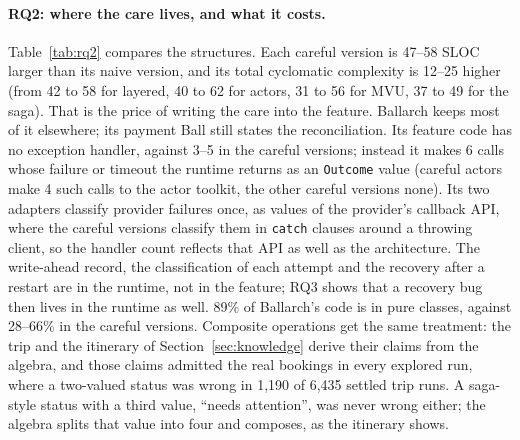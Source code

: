 \documentclass[11pt]{article}
\theoremstyle{definition}
\theoremstyle{plain}
\begin{document}
\begin{table}[t]
\caption{RQ2: structure of the feature code in scenario~A; \emph{Naive} gives the range over the four naive versions. Metrics: CBO~\citep{ChidamberKemerer1994}; LCOM4~\citep{HitzMontazeri1995} and CAMC~\citep{Bansiya1999CAMC} over hand-written methods, without the members the compiler generates; distance from the main sequence $D$~\citep{Martin1994Metrics}, counting efferent coupling to other feature packages only, or to every dependency except the JDK and Kotlin's standard library as Martin defines it; propagation cost~\citep{MacCormackRusnakBaldwin2006} at three granularities; cyclomatic complexity~\citep{McCabe1976} counted on bytecode as JaCoCo defines it~\citep{JaCoCo}, without the branches the compiler generates. Exception handlers are \texttt{catch} clauses and \texttt{runCatching} calls. \emph{Failures returned as values} counts the calls whose failure or timeout a library returns as a value: \texttt{ask} and \texttt{pipeToSelf} in the actor toolkit, \texttt{Call} and \texttt{Runtime.request} in Ballarch. A pure class has no mutable field and no reference to concurrency, I/O, clocks, randomness, the database, the provider or a runtime.}
\label{tab:rq2}
\end{table}

\paragraph{RQ2: where the care lives, and what it costs.} Table~\ref{tab:rq2} compares the structures. Each careful version is 47--58 SLOC larger than its naive version, and its total cyclomatic complexity is 12--25 higher (from 42 to 58 for layered, 40 to 62 for actors, 31 to 56 for MVU, 37 to 49 for the saga). That is the price of writing the care into the feature. Ballarch keeps most of it elsewhere; its payment Ball still states the reconciliation. Its feature code has no exception handler, against 3--5 in the careful versions; instead it makes 6 calls whose failure or timeout the runtime returns as an \texttt{Outcome} value (careful actors make 4 such calls to the actor toolkit, the other careful versions none). Its two adapters classify provider failures once, as values of the provider's callback API, where the careful versions classify them in \texttt{catch} clauses around a throwing client, so the handler count reflects that API as well as the architecture. The write-ahead record, the classification of each attempt and the recovery after a restart are in the runtime, not in the feature; RQ3 shows that a recovery bug then lives in the runtime as well. 89\% of Ballarch's code is in pure classes, against 28--66\% in the careful versions. Composite operations get the same treatment: the trip and the itinerary of Section~\ref{sec:knowledge} derive their claims from the algebra, and those claims admitted the real bookings in every explored run, where a two-valued status was wrong in 1{,}190 of 6{,}435 settled trip runs. A saga-style status with a third value, ``needs attention'', was never wrong either; the algebra splits that value into four and composes, as the itinerary shows.
\end{document}

